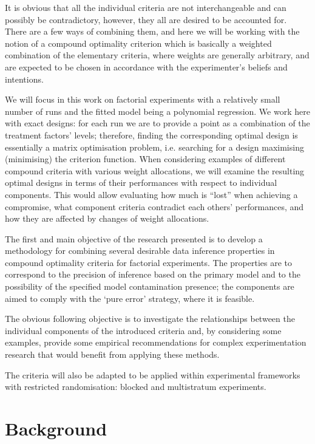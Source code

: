 \documentclass[11pt]{article}
\begin{document}
It is obvious that all the individual criteria are not interchangeable and can possibly be contradictory, however, they all are desired to be accounted for. There are a few ways of combining them, and here we will be working with the notion of a compound optimality criterion which is basically a weighted combination of the elementary criteria, where weights are generally arbitrary, and are expected to be chosen in accordance with the experimenter's beliefs and intentions. 

We will focus in this work on factorial experiments with a relatively small number of runs and the fitted model being a polynomial regression. We work here with exact designs: for each run we are to provide a point as a combination of the treatment factors' levels; therefore, finding the corresponding optimal design is essentially a matrix optimisation problem, i.e. searching for a design maximising (minimising) the criterion function. When considering examples of different compound criteria with various weight allocations, we will examine the resulting optimal designs in terms of their performances with respect to individual components. This would allow evaluating how much is ``lost'' when achieving a compromise, what component criteria contradict each others' performances, and how they are affected by changes of weight allocations.

The first and main objective of the research presented is to develop a methodology for combining several desirable data inference properties in compound optimality criteria for factorial experiments. The properties are to correspond to the precision of inference based on the primary model and to the possibility of the specified model contamination presence; the components are aimed to comply with the `pure error' strategy, where it is feasible.

The obvious following objective is to investigate the relationships between the individual components of the introduced criteria and, by considering some examples, provide some empirical recommendations for complex experimentation research that would benefit from applying these methods.

The criteria will also be adapted to be applied within experimental frameworks with restricted randomisation: blocked and multistratum experiments.

\section{Background}
\end{document}
